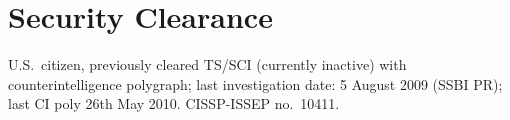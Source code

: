 %
%
\setlength{\fboxsep}{0pt}

\section*{Security Clearance}
\vspace{-2mm}

U.S.\ citizen, previously cleared TS/SCI (currently inactive) with
counterintelligence polygraph; last investigation date: 5 August 2009
(SSBI PR); last CI poly 26th May 2010. CISSP-ISSEP no.\ 10411.

